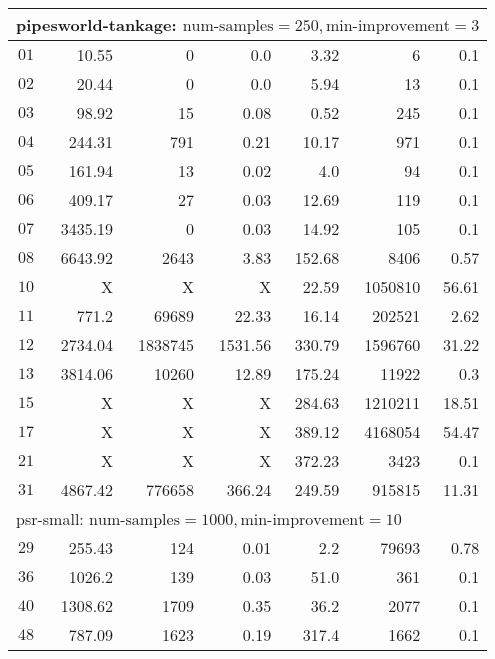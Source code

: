 \begin{longtable}{|c||r|r|r||r|r|r|}
\multicolumn{7}{|l|}{pipesworld-tankage: $\text{num-samples}=250,\text{min-improvement}=3$}\\\hline
$01$ & 10.55 & 0 & 0.0 & 3.32 & 6 & 0.1 \\\hline
$02$ & 20.44 & 0 & 0.0 & 5.94 & 13 & 0.1 \\\hline
$03$ & 98.92 & 15 & 0.08 & 0.52 & 245 & 0.1 \\\hline
$04$ & 244.31 & 791 & 0.21 & 10.17 & 971 & 0.1 \\\hline
$05$ & 161.94 & 13 & 0.02 & 4.0 & 94 & 0.1 \\\hline
$06$ & 409.17 & 27 & 0.03 & 12.69 & 119 & 0.1 \\\hline
$07$ & 3435.19 & 0 & 0.03 & 14.92 & 105 & 0.1 \\\hline
$08$ & 6643.92 & 2643 & 3.83 & 152.68 & 8406 & 0.57 \\\hline
$10$ &  X &  X &  X & 22.59 & 1050810 & 56.61 \\\hline
$11$ & 771.2 & 69689 & 22.33 & 16.14 & 202521 & 2.62 \\\hline
$12$ & 2734.04 & 1838745 & 1531.56 & 330.79 & 1596760 & 31.22 \\\hline
$13$ & 3814.06 & 10260 & 12.89 & 175.24 & 11922 & 0.3 \\\hline
$15$ &  X &  X &  X & 284.63 & 1210211 & 18.51 \\\hline
$17$ &  X &  X &  X & 389.12 & 4168054 & 54.47 \\\hline
$21$ &  X &  X &  X & 372.23 & 3423 & 0.1 \\\hline
$31$ & 4867.42 & 776658 & 366.24 & 249.59 & 915815 & 11.31 \\\hline

\multicolumn{7}{|l|}{psr-small: $\text{num-samples}=1000,\text{min-improvement}=10$}\\\hline
$29$ & 255.43 & 124 & 0.01 & 2.2 & 79693 & 0.78 \\\hline
$36$ & 1026.2 & 139 & 0.03 & 51.0 & 361 & 0.1 \\\hline
$40$ & 1308.62 & 1709 & 0.35 & 36.2 & 2077 & 0.1 \\\hline
$48$ & 787.09 & 1623 & 0.19 & 317.4 & 1662 & 0.1 \\\hline


\end{longtable}
